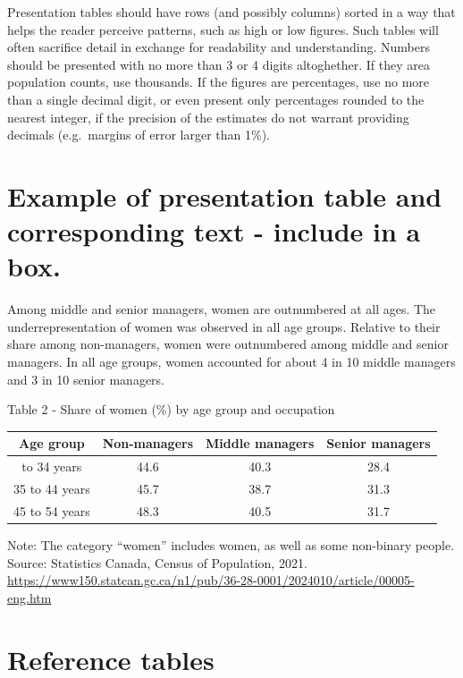 \documentclass[
  12pt,
]{book}
\begin{document}
Presentation tables should have rows (and possibly columns) sorted in a way that helps the reader perceive patterns, such as high or low figures. Such tables will often sacrifice detail in exchange for readability and understanding. Numbers should be presented with no more than 3 or 4 digits altoghether. If they area population counts, use thousands. If the figures are percentages, use no more than a single decimal digit, or even present only percentages rounded to the nearest integer, if the precision of the estimates do not warrant providing decimals (e.g.~margins of error larger than 1\%).

\hypertarget{example-of-presentation-table-and-corresponding-text---include-in-a-box.}{%
\section{Example of presentation table and corresponding text - include in a box.}\label{example-of-presentation-table-and-corresponding-text---include-in-a-box.}}

Among middle and senior managers, women are outnumbered at all ages. The underrepresentation of women was observed in all age groups. Relative to their share among non-managers, women were outnumbered among middle and senior managers. In all age groups, women accounted for about 4 in 10 middle managers and 3 in 10 senior managers.

Table 2 - Share of women (\%) by age group and occupation

\begin{longtable}[]{@{}cccc@{}}
\toprule\noalign{}
Age group & Non-managers & Middle managers & Senior managers \\
\midrule\noalign{}
\endhead
\bottomrule\noalign{}
\endlastfoot
25 to 34 years & 44.6 & 40.3 & 28.4 \\
35 to 44 years & 45.7 & 38.7 & 31.3 \\
45 to 54 years & 48.3 & 40.5 & 31.7 \\
\end{longtable}

Note: The category ``women'' includes women, as well as some non-binary people. Source: Statistics Canada, Census of Population, 2021. \url{https://www150.statcan.gc.ca/n1/pub/36-28-0001/2024010/article/00005-eng.htm}

\hypertarget{reference-tables}{%
\section{Reference tables}\label{reference-tables}}
\end{document}
